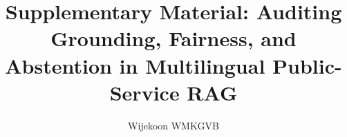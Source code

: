 \documentclass[sigconf,nonacm]{acmart}
\begin{document}
\title{Supplementary Material: Auditing Grounding, Fairness, and Abstention in Multilingual Public-Service RAG}

\author{Wijekoon WMKGVB}


\end{document}
